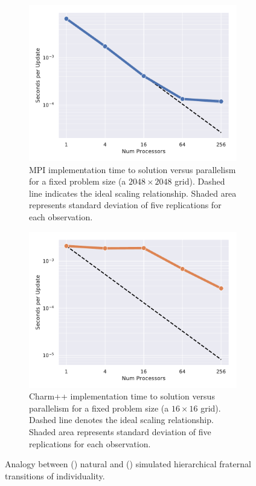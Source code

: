 
\begin{figure}
\begin{subfigure}[b]{0.5\textwidth}
\includegraphics[width=\textwidth]{img/MPIStrong}
\caption{
MPI implementation time to solution versus parallelism for a fixed problem size (a $2048\times2048$ grid).
Dashed line indicates the ideal scaling relationship.
Shaded area represents standard deviation of five replications for each observation.
}
\label{fig:mpi_weak}
\end{subfigure}
\begin{subfigure}[b]{0.5\textwidth}
  \includegraphics[width=\textwidth]{img/CharmStrong}
\caption{
Charm++ implementation time to solution versus parallelism for a fixed problem size (a $16\times16$ grid).
Dashed line denotes the ideal scaling relationship.
Shaded area represents standard deviation of five replications for each observation.
}
\label{fig:charm_weak}
\end{subfigure}
\caption{
Analogy between () natural and () simulated hierarchical fraternal transitions of individuality.
}
\end{figure}

